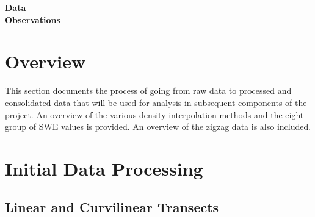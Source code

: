 \documentclass[12pt]{article}
\begin{document}

\begin{center}
\Large \textbf{Data\\ Observations}
\end{center}


\section*{Overview}

This section documents the process of going from raw data to processed and consolidated data that will be used for analysis in subsequent components of the project. An overview of the various density interpolation methods and the eight group of SWE values is provided. An overview of the zigzag data is also included. 

\tableofcontents
\pagebreak

\section{Initial Data Processing}

\subsection{Linear and Curvilinear Transects}
\end{document}

